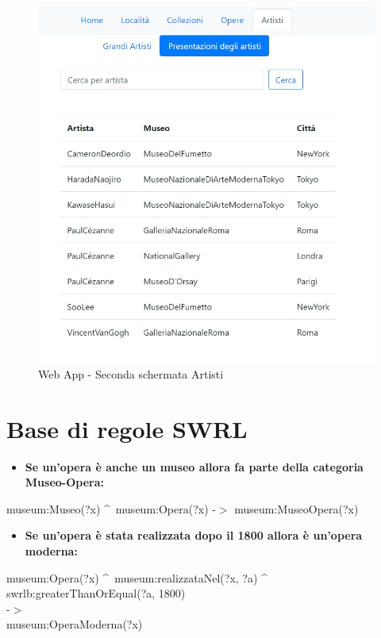 \documentclass[12pt]{article}
\begin{document}
\begin{figure}[!p]
      \includegraphics[scale=0.5]{fig/Schermata 5.2 webapp.jpeg}
   \caption{Web App - Seconda schermata Artisti}\label{fig:picture}
\end{figure}
\newpage
\section{Base di regole SWRL}

\begin{itemize}
 \item \textbf{Se un’opera è anche un museo allora fa parte della categoria Museo-Opera:}		
\end{itemize} 
\begin{center}
museum:Museo(?x) \textasciicircum \, museum:Opera(?x) -$>$ museum:MuseoOpera(?x)
\end{center}

\begin{itemize}
 \item \textbf{Se un’opera è stata realizzata dopo il 1800 allora è un’opera moderna:}
\end{itemize} 
\begin{center}
museum:Opera(?x) \textasciicircum \, museum:realizzataNel(?x, ?a) \textasciicircum \, swrlb:greaterThanOrEqual(?a, 1800) \\
-$>$ \\
museum:OperaModerna(?x)
\end{center}
\end{document}
